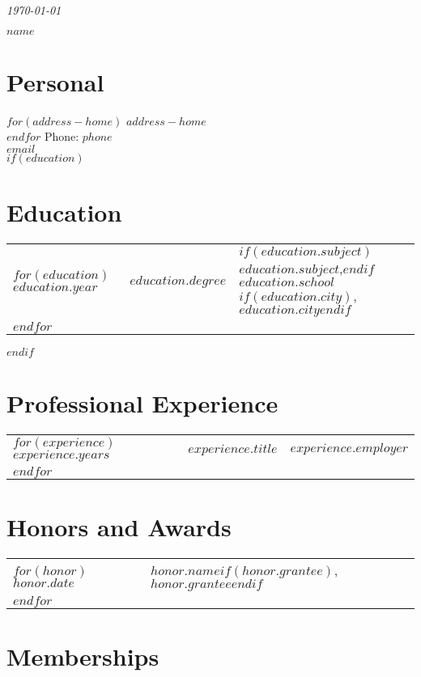 \documentclass[martgin, line]{article}
\begin{document}
\begin{flushright}
  \textit{\today}
\end{flushright}



\begin{LARGE}
  \textbf{$name$}
\end{LARGE}

\section*{Personal}

$for(address-home)$
$address-home$\\
$endfor$
Phone: $phone$\\
\href{mailto:$email$}{$email$}\\


$if(education)$
\section*{Education}
\noindent
\begin{tabular}{lll}
$for(education)$
$education.year$&$education.degree$&
$if(education.subject)$$education.subject$,$endif$
$education.school$$if(education.city)$, $education.city$$endif$\\
$endfor$
\end{tabular}
$endif$

\section*{Professional Experience}
\noindent
\begin{tabular}{lll}
$for(experience)$
$experience.years$&
$experience.title$&
$experience.employer$\\
$endfor$
\end{tabular}

\section*{Honors and Awards}
\begin{tabular}{lp{5.5in}}
$for(honor)$
$honor.date$&
$honor.name$$if(honor.grantee)$, $honor.grantee$$endif$
\\
$endfor$
\end{tabular}


\section*{Memberships}
\end{document}
